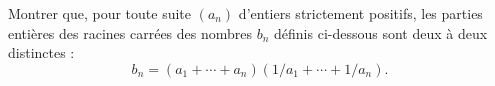 Montrer que, pour toute suite $(a_n)$ d'entiers strictement positifs, les parties entières des racines carrées des nombres $b_n$ définis ci-dessous sont deux à deux distinctes :
\[ b_n = (a_1 + \cdots + a_n)(1/a_1 + \cdots + 1/a_n). \]
